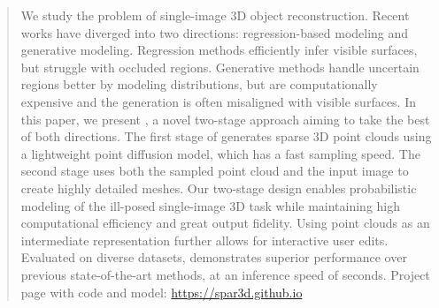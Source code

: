\begin{abstract}
We study the problem of single-image 3D object reconstruction. Recent works have diverged into two directions: regression-based modeling and generative modeling. Regression methods efficiently infer visible surfaces, but struggle with occluded regions. Generative methods handle uncertain regions better by modeling distributions, but are computationally expensive and the generation is often misaligned with visible surfaces. In this paper, we present \method, a novel two-stage approach aiming to take the best of both directions. The first stage of \method generates sparse 3D point clouds using a lightweight point diffusion model, which has a fast sampling speed. The second stage uses both the sampled point cloud and the input image to create highly detailed meshes. Our two-stage design enables probabilistic modeling of the ill-posed single-image 3D task while maintaining high computational efficiency and great output fidelity. Using point clouds as an intermediate representation further allows for interactive user edits. Evaluated on diverse datasets, \method demonstrates superior performance over previous state-of-the-art methods, at an inference speed of \gentime seconds.
Project page with code and model: \url{https://spar3d.github.io}
\end{abstract}
